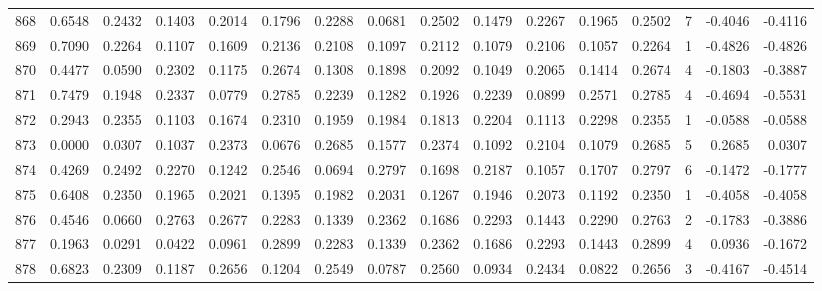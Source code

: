 \begin{tabular}{lrrrrrrrrrrrrrrr}
868 &      0.6548 &  0.2432 &  0.1403 &  0.2014 &  0.1796 &  0.2288 &  0.0681 &  0.2502 &  0.1479 &  0.2267 &   0.1965 &     0.2502 &      7 &                   -0.4046 &                    -0.4116 \\
869 &      0.7090 &  0.2264 &  0.1107 &  0.1609 &  0.2136 &  0.2108 &  0.1097 &  0.2112 &  0.1079 &  0.2106 &   0.1057 &     0.2264 &      1 &                   -0.4826 &                    -0.4826 \\
870 &      0.4477 &  0.0590 &  0.2302 &  0.1175 &  0.2674 &  0.1308 &  0.1898 &  0.2092 &  0.1049 &  0.2065 &   0.1414 &     0.2674 &      4 &                   -0.1803 &                    -0.3887 \\
871 &      0.7479 &  0.1948 &  0.2337 &  0.0779 &  0.2785 &  0.2239 &  0.1282 &  0.1926 &  0.2239 &  0.0899 &   0.2571 &     0.2785 &      4 &                   -0.4694 &                    -0.5531 \\
872 &      0.2943 &  0.2355 &  0.1103 &  0.1674 &  0.2310 &  0.1959 &  0.1984 &  0.1813 &  0.2204 &  0.1113 &   0.2298 &     0.2355 &      1 &                   -0.0588 &                    -0.0588 \\
873 &      0.0000 &  0.0307 &  0.1037 &  0.2373 &  0.0676 &  0.2685 &  0.1577 &  0.2374 &  0.1092 &  0.2104 &   0.1079 &     0.2685 &      5 &                    0.2685 &                     0.0307 \\
874 &      0.4269 &  0.2492 &  0.2270 &  0.1242 &  0.2546 &  0.0694 &  0.2797 &  0.1698 &  0.2187 &  0.1057 &   0.1707 &     0.2797 &      6 &                   -0.1472 &                    -0.1777 \\
875 &      0.6408 &  0.2350 &  0.1965 &  0.2021 &  0.1395 &  0.1982 &  0.2031 &  0.1267 &  0.1946 &  0.2073 &   0.1192 &     0.2350 &      1 &                   -0.4058 &                    -0.4058 \\
876 &      0.4546 &  0.0660 &  0.2763 &  0.2677 &  0.2283 &  0.1339 &  0.2362 &  0.1686 &  0.2293 &  0.1443 &   0.2290 &     0.2763 &      2 &                   -0.1783 &                    -0.3886 \\
877 &      0.1963 &  0.0291 &  0.0422 &  0.0961 &  0.2899 &  0.2283 &  0.1339 &  0.2362 &  0.1686 &  0.2293 &   0.1443 &     0.2899 &      4 &                    0.0936 &                    -0.1672 \\
878 &      0.6823 &  0.2309 &  0.1187 &  0.2656 &  0.1204 &  0.2549 &  0.0787 &  0.2560 &  0.0934 &  0.2434 &   0.0822 &     0.2656 &      3 &                   -0.4167 &                    -0.4514 \\

\end{tabular}
